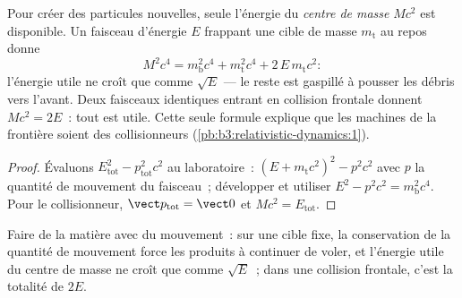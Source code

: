 \begin{proposition}\label{prop:b3:relativistic-dynamics:threshold}
Pour créer des particules nouvelles, seule l'énergie du \emph{centre de
masse} $Mc^2$ est disponible. Un faisceau d'énergie $E$ frappant une
cible de masse $m_{\text{t}}$ au repos donne
\[
M^2c^4 = m_{\text{b}}^2c^4 + m_{\text{t}}^2c^4 +
2\,E\,m_{\text{t}}c^2 :
\]
l'énergie utile ne croît que comme $\sqrt E$ --- le reste est gaspillé
à pousser les débris vers l'avant. Deux faisceaux identiques entrant en
collision frontale donnent $Mc^2 = 2E$~: tout est utile. Cette seule
formule explique que les machines de la frontière soient des
collisionneurs (\cref{pb:b3:relativistic-dynamics:1}).
\end{proposition}

\begin{proof}
Évaluons $E_{\text{tot}}^2 - p_{\text{tot}}^2c^2$ au laboratoire~:
$(E + m_{\text{t}}c^2)^2 - p^2c^2$ avec $p$ la quantité de mouvement du
faisceau~; développer et utiliser $E^2 - p^2c^2 = m_{\text{b}}^2c^4$.
Pour le collisionneur, $\vect p_{\text{tot}} = \vect 0$ et
$Mc^2 = E_{\text{tot}}$.
\end{proof}

\begin{omfigure}

{\small Faire de la matière avec du mouvement~: sur une cible fixe, la
conservation de la quantité de mouvement force les produits à
continuer de voler, et l'énergie utile du centre de masse ne croît que
comme $\sqrt E$~; dans une collision frontale, c'est la totalité de
$2E$.}
\end{omfigure}

